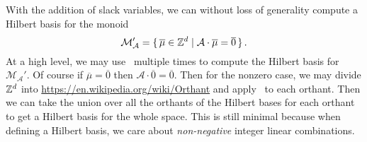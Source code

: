 \documentclass[letterpaper, 11pt, oneside]{book}
\begin{document}
\begin{sol}
  With the addition of slack variables, we can without loss of generality compute a Hilbert basis for the monoid
  \[
    \mathcal{M}_{\mathcal{A}}' = \set{\overline{\mu} \in \mathbb{Z}^{d} | \mathcal{A} \cdot \overline{\mu} = \overline{0}}.
  \]
  At a high level, we may use~\cite[Algorithm 1.4.5]{book:AIT} multiple times to compute the Hilbert basis for $\mathcal{M}_{\mathcal{A}}'$.
  Of course if $\overline{\mu} = \overline{0}$ then $\mathcal{A} \cdot \overline{0} = \overline{0}$.
  Then for the nonzero case, we may divide $\mathbb{Z}^{d}$ into \href{orthants}{https://en.wikipedia.org/wiki/Orthant} and apply~\cite{Algorithm 1.4.5} to each orthant.
  Then we can take the union over all the orthants of the Hilbert bases for each orthant to get a Hilbert basis for the whole space.
  This is still minimal because when defining a Hilbert basis, we care about \emph{non-negative} integer linear combinations.
\end{sol}

\printbibliography
\end{document}
